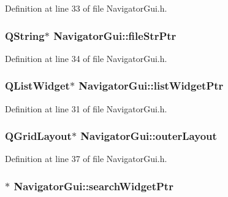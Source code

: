 Definition at line 33 of file Navigator\-Gui.\-h.

\hypertarget{class_navigator_gui_aa233c8e6f7634b4de98b2dcaaa86ed69}{
\subsubsection[{file\-Str\-Ptr}]{\setlength{\rightskip}{0pt plus 5cm}Q\-String$\ast$ Navigator\-Gui\-::file\-Str\-Ptr\hspace{0.3cm}{\ttfamily [private]}}}\label{class_navigator_gui_aa233c8e6f7634b4de98b2dcaaa86ed69}


Definition at line 34 of file Navigator\-Gui.\-h.

\hypertarget{class_navigator_gui_aa3732fbecbd29c6a22eaebe82bb57af7}{
\subsubsection[{list\-Widget\-Ptr}]{\setlength{\rightskip}{0pt plus 5cm}Q\-List\-Widget$\ast$ Navigator\-Gui\-::list\-Widget\-Ptr\hspace{0.3cm}{\ttfamily [private]}}}\label{class_navigator_gui_aa3732fbecbd29c6a22eaebe82bb57af7}


Definition at line 31 of file Navigator\-Gui.\-h.

\hypertarget{class_navigator_gui_a0e981a409e2879e799f5e05e0c695f4a}{
\subsubsection[{outer\-Layout}]{\setlength{\rightskip}{0pt plus 5cm}Q\-Grid\-Layout$\ast$ Navigator\-Gui\-::outer\-Layout\hspace{0.3cm}{\ttfamily [private]}}}\label{class_navigator_gui_a0e981a409e2879e799f5e05e0c695f4a}


Definition at line 37 of file Navigator\-Gui.\-h.

\hypertarget{class_navigator_gui_a33531deedb97ceb340409fc4e5f8620e}{
\subsubsection[{search\-Widget\-Ptr}]{$\ast$ Navigator\-Gui\-::search\-Widget\-Ptr\hspace{0.3cm}{\ttfamily [private]}}}\label{class_navigator_gui_a33531deedb97ceb340409fc4e5f8620e}



